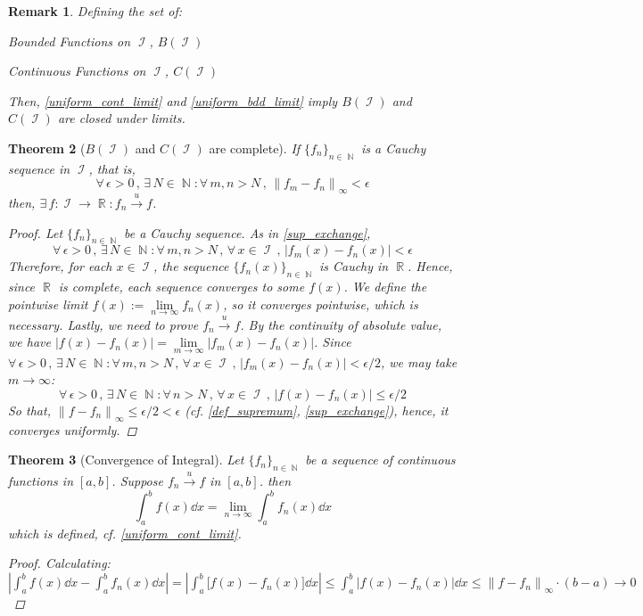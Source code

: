\documentclass[12pt]{article}
\let\ee\epsilon
\newcommand{\Forall}[1]{\forall\,{#1}\,,\,}
\newcommand{\Exist}[1]{\exists\,{#1}:}
\DeclareMathOperator{\R}{\mathbb{R}}
\DeclareMathOperator{\N}{\mathbb{N}}
\DeclareMathOperator{\I}{\mathcal{I}}
\newcommand{\seq}[2]{\{{#1}\}_{#2\in\N}}
\newcommand{\fsup}[1]{\left\|#1\right\|_\infty}
\newcommand{\uto}[0]{\overset{\displaystyle u}{\longrightarrow}}
\newtheorem{theorem}{Theorem}[subsection]
\newtheorem{remark}[theorem]{Remark}
\begin{document}
\begin{remark}
  Defining the set of:
  \begin{compactitem}
    \item Bounded Functions on $\I$, $B(\I)$
    \item Continuous Functions on $\I$, $C(\I)$
  \end{compactitem}
  Then, \ref{uniform_cont_limit} and \ref{uniform_bdd_limit} imply $B(\I)$ and $C(\I)$ are closed under limits.
\end{remark}

\begin{theorem}[$B(\I)$ and $C(\I)$ are complete]
  \label{uniform_cauchy}
  If $\seq{f_n}{n}$ is a Cauchy sequence in $\I$, that is, $$\Forall{\ee >0}\Exist{N\in\N}\Forall{m,n > N}\fsup{f_m-f_n}<\ee$$ then, $\Exist{f:\I\to\R}f_n\uto f$.
  \begin{proof}
    Let $\seq{f_n}{n}$ be a Cauchy sequence. As in \ref{sup_exchange},  $$\Forall{\ee >0}\Exist{N\in\N}\Forall{m,n > N}\Forall{x\in\I}|f_m(x)-f_n(x)|<\ee$$ Therefore, for each $x\in\I$, the sequence $\seq{f_n(x)}{n}$ is Cauchy in $\R$. Hence, since $\R$ is complete, each sequence converges to some $f(x)$. We define the pointwise limit $f(x):=\lim\limits_{n\to \infty}{f_n(x)}$, so it converges pointwise, which is necessary. Lastly, we need to prove $f_n\uto f$. By the continuity of absolute value, we have $|f(x)-f_n(x)|=\lim\limits_{m\to\infty}{|f_m(x)-f_n(x)|}$. Since $\Forall{\ee >0}\Exist{N \in \N}\Forall{m,n > N}\Forall{x\in\I} |f_m(x)-f_n(x)|<\ee/2$, we may take $m\to\infty$:
    $$\Forall{\ee >0}\Exist{N \in \N}\Forall{n > N}\Forall{x\in\I} |f(x)-f_n(x)|\leq\ee/2$$
    So that, $\fsup{f-f_n}\leq\ee/2<\ee $ (cf. \ref{def_supremum}, \ref{sup_exchange}), hence, it converges uniformly.
  \end{proof}
\end{theorem}

\begin{theorem}[Convergence of Integral]
  \label{uniform_integral}
  Let $\seq{f_n}{n}$ be a sequence of continuous functions in $[a,b]$. Suppose $f_n\uto f$ in $[a,b]$. then $$\int_a^b f(x)\dd{x}=\lim_{n\to\infty}\int_a^b f_n(x)\dd{x}$$
  which is defined, cf. \ref{uniform_cont_limit}.
  \begin{proof}
    Calculating: $\displaystyle \left|\int_a^b f(x)\dd{x}-\int_a^b f_n(x)\dd{x}\right|=\left|\int_a^b \Big[f(x)-f_n(x)\Big]\dd{x}\right| \leq \int_a^b \big|f(x)-f_n(x)\big|\dd{x}\leq \fsup{f-f_n}\cdot(b-a)\to 0$
  \end{proof}
\end{theorem}
\end{document}
